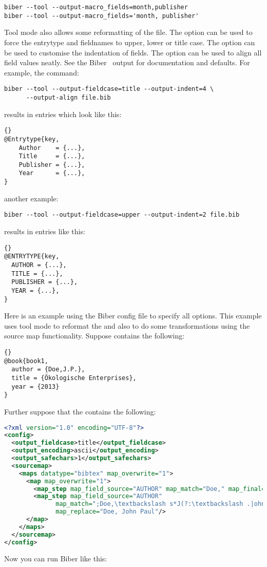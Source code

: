 \documentclass{ltxdockit}
\newcommand*{\biber}{Biber\xspace}
\begin{document}
\begin{verbatim}
biber --tool --output-macro_fields=month,publisher
biber --tool --output-macro_fields='month, publisher'
\end{verbatim}

Tool mode also allows some reformatting of the  file. The
option  can be used to force the entrytype and
fieldnames to upper, lower or title case. The option
 can be used to customise the indentation of
fields. The option  can be used to align all field
values neatly. See the \biber\  output for documentation
and defaults. For example, the command:

\begin{verbatim}
biber --tool --output-fieldcase=title --output-indent=4 \
      --output-align file.bib
\end{verbatim}
%
results in  entries which look like this:

\begin{lstlisting}[style=bibtex, columns=fixed]{}
@Entrytype{key,
    Author    = {...},
    Title     = {...},
    Publisher = {...},
    Year      = {...},
}
\end{lstlisting}
%
another example:
\begin{verbatim}
biber --tool --output-fieldcase=upper --output-indent=2 file.bib
\end{verbatim}
%
results in entries like this:

\begin{lstlisting}[style=bibtex]{}
@ENTRYTYPE{key,
  AUTHOR = {...},
  TITLE = {...},
  PUBLISHER = {...},
  YEAR = {...},
}
\end{lstlisting}
%
Here is an example using the \biber config file to specify all options.
This example uses tool mode to reformat the \file{.bib} and also to do some
transformations using the source map functionality. Suppose
 contains the following:

\begin{lstlisting}[style=bibtex]{}
@book{book1,
  author = {Doe,J.P.},
  title = {Ökologische Enterprises},
  year = {2013}
}
\end{lstlisting}
%
Further suppose that the  contains the following:

\begin{lstlisting}[language=xml,escapechar=;,mathescape=true]
<?xml version="1.0" encoding="UTF-8"?>
<config>
  <output_fieldcase>title</output_fieldcase>
  <output_encoding>ascii</output_encoding>
  <output_safechars>1</output_safechars>
  <sourcemap>
    <maps datatype="bibtex" map_overwrite="1">
      <map map_overwrite="1">
        <map_step map_field_source="AUTHOR" map_match="Doe," map_final="1"/>
        <map_step map_field_source="AUTHOR"
              map_match=";Doe,\textbackslash s*J(?:\textbackslash .|ohn)(?:[-]*)(?:P\textbackslash .|Paul)*;"
              map_replace="Doe, John Paul"/>
      </map>
    </maps>
  </sourcemap>
</config>
\end{lstlisting}
%
Now you can run \biber like this:
\end{document}
